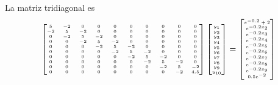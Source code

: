 \begin{frame}
La matriz tridiagonal es
\[ \tiny{\begin{bmatrix}
5 & -2 & 0 & 0 & 0 & 0 & 0 & 0 & 0 & 0 \\
-2 & 5 & -2 & 0 & 0 & 0 & 0 & 0 & 0 & 0 \\
0 & -2 & 5 & -2 & 0 & 0 & 0 & 0 & 0 & 0 \\
0 & 0 & -2 & 5 & -2 & 0 & 0 & 0 & 0 & 0 \\
0 & 0 & 0 & -2 & 5 & -2 & 0 & 0 & 0 & 0 \\
0 & 0 & 0 & 0& -2 & 5 & -2 & 0 & 0 & 0 \\
0 & 0 & 0 & 0 & 0 & -2 & 5 & -2 & 0 & 0 \\
0 & 0 & 0 & 0 & 0 & 0 & -2 & 5 & -2 & 0 \\
0 & 0 & 0 & 0 & 0 & 0 & 0 & -2 & 5 & -2 \\
0 & 0 & 0 & 0 & 0 & 0 & 0 & 0 & -2 & 4.5 
\end{bmatrix}
\begin{bmatrix}
y_{1} \\
y_{2} \\
y_{3} \\
y_{4} \\
y_{5} \\
y_{6} \\
y_{7} \\
y_{8} \\
y_{9} \\
y_{10} \\
\end{bmatrix} =
\begin{bmatrix}
e^{-0.2}+2 \\
e^{-0.2x_{2}} \\
e^{-0.2x_{3}} \\
e^{-0.2x_{4}} \\
e^{-0.2x_{5}} \\
e^{-0.2x_{6}} \\
e^{-0.2x_{7}} \\
e^{-0.2x_{8}} \\
e^{-0.2x_{9}} \\
0.5e^{-2}
\end{bmatrix}} \]
\end{frame}

